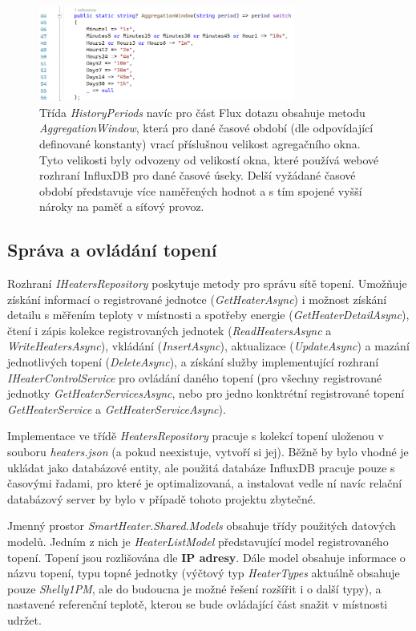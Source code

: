 \begin{figure}[hbt]
\includegraphics[width=0.75\textwidth]{obrazky-figures/code-aggregationwindow.png}
\caption{Třída {\it HistoryPeriods} navíc pro část Flux dotazu obsahuje metodu {\it AggregationWindow}, která pro dané časové období (dle odpovídající definované konstanty) vrací příslušnou velikost agregačního okna. Tyto velikosti byly odvozeny od velikostí okna, které používá webové rozhraní InfluxDB pro dané časové úseky. Delší vyžádané časové období představuje více naměřených hodnot a s tím spojené vyšší nároky na paměť a síťový provoz.}
\end{figure}


\subsection{Správa a ovládání topení}
Rozhraní {\it IHeatersRepository} poskytuje metody pro správu sítě topení. Umožňuje získání informací o registrované jednotce ({\it GetHeaterAsync}) i možnost získání detailu s měřením teploty v místnosti a spotřeby energie ({\it GetHeaterDetailAsync}), čtení i zápis kolekce registrovaných jednotek ({\it ReadHeatersAsync} a {\it WriteHeatersAsync}), vkládání ({\it InsertAsync}), aktualizace ({\it UpdateAsync}) a mazání jednotlivých topení ({\it DeleteAsync}), a získání služby implementující rozhraní {\it IHeaterControlService} pro ovládání daného topení (pro všechny registrované jednotky {\it GetHeaterServicesAsync}, nebo pro jedno konktrétní registrované topení {\it GetHeaterService} a {\it GetHeaterServiceAsync}).
 
Implementace ve třídě {\it HeatersRepository} pracuje s kolekcí topení uloženou v souboru {\it heaters.json} (a pokud neexistuje, vytvoří si jej). Běžně by bylo vhodné je ukládat jako databázové entity, ale použitá databáze InfluxDB pracuje pouze s časovými řadami, pro které je optimalizovaná, a instalovat vedle ní navíc relační databázový server by bylo v případě tohoto projektu zbytečné.

Jmenný prostor {\it SmartHeater.Shared.Models} obsahuje třídy použitých datových modelů. Jedním z nich je {\it HeaterListModel} představující model registrovaného topení. Topení jsou rozlišována dle \textbf{IP adresy}. Dále model obsahuje informace o názvu topení, typu topné jednotky (výčtový typ {\it HeaterTypes} aktuálně obsahuje pouze {\it Shelly1PM}, ale do budoucna je možné řešení rozšířit i o další typy), a nastavené referenční teplotě, kterou se bude ovládající část snažit v místnosti udržet.

